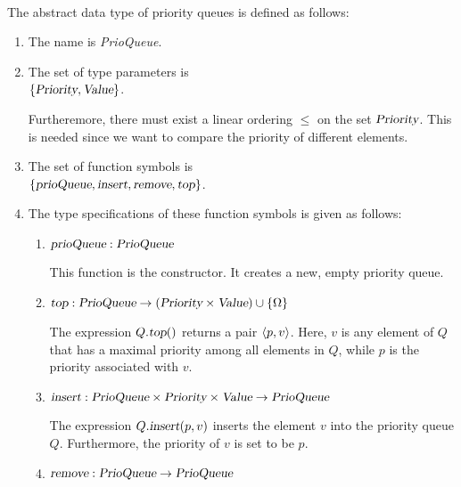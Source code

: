 \begin{Definition} \hspace*{\fill} \\
  The abstract data type of priority queues is defined as follows:
  \begin{enumerate}
  \item The name is \textsl{PrioQueue}.
  \item The set of type parameters is \\[0.1cm]
        \hspace*{1.3cm} $\{ \textsl{Priority}, \textsl{Value} \}$.

        Furtheremore, there must exist a linear ordering $\leq$ on the set $\textsl{Priority}$.
        This is needed since we want to compare the priority of different elements.
  \item The set of function symbols is \\[0.1cm]
       \hspace*{1.3cm} 
       $\{ \textsl{prioQueue}, \textsl{insert}, \textsl{remove}, \textsl{top} \}$.
  \item The type specifications of these function symbols is given as follows:
        \begin{enumerate}
        \item $\textsl{prioQueue}: \textsl{PrioQueue}$

              This function is the constructor. It creates a new, empty priority queue.
        \item $\textsl{top}: \textsl{PrioQueue}  \rightarrow (\textsl{Priority} \times \textsl{Value}) \cup \{\Omega\}$

              The expression $Q.\textsl{top}()$ returns a pair $\pair(p,v)$.  Here,  $v$ is any
              element of $Q$ that has a  maximal priority among all elements in $Q$, while $p$ is
              the priority associated with $v$. 
        \item $\textsl{insert}: \textsl{PrioQueue} \times \textsl{Priority} \times \textsl{Value} \rightarrow \textsl{PrioQueue}$

              The expression $Q.\textsl{insert}(p,v)$ inserts the  element $v$ into the priority queue $Q$.
              Furthermore, the priority of $v$ is set to be $p$.
        \item $\textsl{remove}: \textsl{PrioQueue} \rightarrow \textsl{PrioQueue}$


\end{enumerate}
\end{enumerate}
\end{Definition}
